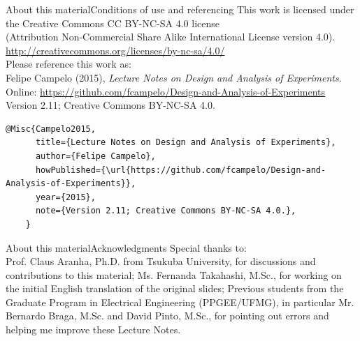 \documentclass[t]{beamer}
\begin{document}
\begin{ftstf}{About this material}{Conditions of use and referencing}
\centering\footnotesize This work is licensed under the Creative Commons CC BY-NC-SA 4.0 license\\(Attribution Non-Commercial Share Alike International License version 4.0).\\
\vhalf
\url{http://creativecommons.org/licenses/by-nc-sa/4.0/}\\
\vone
\footnotesize Please reference this work as:\\
\footnotesize \flushleft Felipe Campelo (2015), \textit{Lecture Notes on Design and Analysis of Experiments}.\\Online: {\scriptsize\url{https://github.com/fcampelo/Design-and-Analysis-of-Experiments}}\\
Version 2.11; Creative Commons BY-NC-SA 4.0.\\

\begin{Verbatim}[fontsize=\tiny]
    @Misc{Campelo2015,
      title={Lecture Notes on Design and Analysis of Experiments},
      author={Felipe Campelo},
      howPublished={\url{https://github.com/fcampelo/Design-and-Analysis-of-Experiments}},
      year={2015},
      note={Version 2.11; Creative Commons BY-NC-SA 4.0.},
    }
\end{Verbatim}

\end{ftstf}


\begin{ftst}{About this material}{Acknowledgments}
\footnotesize Special thanks to:\\
\vhalf
\bitems Prof. Claus Aranha, Ph.D. from Tsukuba University, for discussions and contributions to this material;
\spitem Ms. Fernanda Takahashi, M.Sc., for working on the initial English translation of the original slides;
\spitem Previous students from the Graduate Program in Electrical Engineering (PPGEE/UFMG), in particular Mr. Bernardo Braga, M.Sc. and David Pinto, M.Sc., for pointing out errors and helping me improve these Lecture Notes.
\eitem
\end{ftst}
\end{document}
